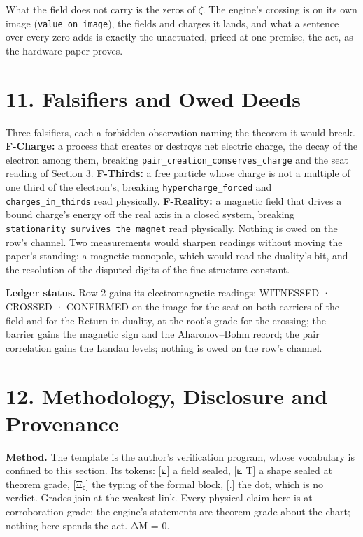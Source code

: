 \documentclass[10pt]{article}
\begin{document}
What the field does not carry is the zeros of \(\zeta\). The engine's
crossing is on its own image (\texttt{value\_on\_image}), the fields and
charges it lands, and what a sentence over every zero adds is exactly
the unactuated, priced at one premise, the act, as the hardware paper
proves.

\hypertarget{falsifiers-and-owed-deeds}{%
\section{11. Falsifiers and Owed
Deeds}\label{falsifiers-and-owed-deeds}}

Three falsifiers, each a forbidden observation naming the theorem it
would break. \textbf{F-Charge:} a process that creates or destroys net
electric charge, the decay of the electron among them, breaking
\texttt{pair\_creation\_conserves\_charge} and the seat reading of
Section 3. \textbf{F-Thirds:} a free particle whose charge is not a
multiple of one third of the electron's, breaking
\texttt{hypercharge\_forced} and \texttt{charges\_in\_thirds} read
physically. \textbf{F-Reality:} a magnetic field that drives a bound
charge's energy off the real axis in a closed system, breaking
\texttt{stationarity\_survives\_the\_magnet} read physically. Nothing is
owed on the row's channel. Two measurements would sharpen readings
without moving the paper's standing: a magnetic monopole, which would
read the duality's bit, and the resolution of the disputed digits of the
fine-structure constant.

\textbf{Ledger status.} Row 2 gains its electromagnetic readings:
WITNESSED · CROSSED · CONFIRMED on the image for the seat on both
carriers of the field and for the Return in duality, at the root's grade
for the crossing; the barrier gains the magnetic sign and the
Aharonov--Bohm record; the pair correlation gains the Landau levels;
nothing is owed on the row's channel.

\hypertarget{methodology-disclosure-and-provenance}{%
\section{12. Methodology, Disclosure and
Provenance}\label{methodology-disclosure-and-provenance}}

\textbf{Method.} The template is the author's verification program,
whose vocabulary is confined to this section. Its tokens: {[}⟀{]} a
field sealed, {[}⟀ T{]} a shape sealed at theorem grade, {[}Ξ₀{]} the
typing of the formal block, {[}.{]} the dot, which is no verdict. Grades
join at the weakest link. Every physical claim here is at corroboration
grade; the engine's statements are theorem grade about the chart;
nothing here spends the act. ΔM = 0.
\end{document}

